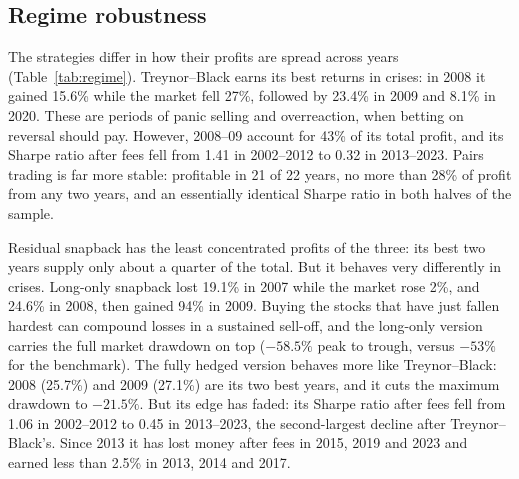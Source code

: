 \documentclass[11pt,letterpaper]{article}
\begin{document}
\subsection{Regime robustness}







The strategies differ in how their profits are spread across years (Table~\ref{tab:regime}). Treynor--Black earns its best returns in crises: in 2008 it gained 15.6\% while the market fell 27\%, followed by 23.4\% in 2009 and 8.1\% in 2020. These are periods of panic selling and overreaction, when betting on reversal should pay. However, 2008--09 account for 43\% of its total profit, and its Sharpe ratio after fees fell from 1.41 in 2002--2012 to 0.32 in 2013--2023. Pairs trading is far more stable: profitable in 21 of 22 years, no more than 28\% of profit from any two years, and an essentially identical Sharpe ratio in both halves of the sample.

Residual snapback has the least concentrated profits of the three: its best two years supply only about a quarter of the total. But it behaves very differently in crises. Long-only snapback lost 19.1\% in 2007 while the market rose 2\%, and 24.6\% in 2008, then gained 94\% in 2009. Buying the stocks that have just fallen hardest can compound losses in a sustained sell-off, and the long-only version carries the full market drawdown on top ($-58.5\%$ peak to trough, versus $-53\%$ for the benchmark). The fully hedged version behaves more like Treynor--Black: 2008 (25.7\%) and 2009 (27.1\%) are its two best years, and it cuts the maximum drawdown to $-21.5\%$. But its edge has faded: its Sharpe ratio after fees fell from 1.06 in 2002--2012 to 0.45 in 2013--2023, the second-largest decline after Treynor--Black's. Since 2013 it has lost money after fees in 2015, 2019 and 2023 and earned less than 2.5\% in 2013, 2014 and 2017.
\end{document}

